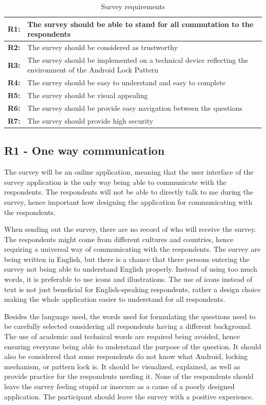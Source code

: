     \begin{table}[H]
      \centering
      \begin{tabular}{ p{1cm} | p{9cm} }
        \hline
        {\bf R1:} & The survey should be able to stand for all commutation to the respondents \\ \hline
        {\bf R2:} & The survey should be considered as trustworthy \\ \hline
        {\bf R3:} & The survey should be implemented on a technical device reflecting the environment of the Android Lock Pattern \\ \hline
        {\bf R4:} & The survey should be easy to understand and easy to complete \\ \hline
        {\bf R5:} & The survey should be visual appealing \\ \hline
        {\bf R6:} & The survey should be provide easy navigation between the questions \\ \hline
        {\bf R7:} & The survey should provide high security \\ \hline
      \end{tabular}
      \caption{Survey requirements}
      \label{tab:requirements}
    \end{table}

    \subsection*{R1 - One way communication}
    The survey will be an online application, meaning that the user interface of the survey application is the only way being able to communicate with the respondents. The respondents will not be able to directly talk to me during the survey, hence important how designing the application for communicating with the respondents.

    When sending out the survey, there are no record of who will receive the survey.  The respondents might come from different cultures and countries, hence requiring a universal way of communicating with the respondents. The survey are being written in English, but there is a chance that there persons entering the survey not being able to understand English properly. Instead of using too much words, it is preferable to use icons and illustrations. The use of icons instead of text is not just beneficial for English-speaking respondents, rather a design choice making the whole application easier to understand for all respondents.

    Besides the language used, the words used for formulating the questions need to be carefully selected considering all respondents having a different background. The use of academic and technical words are required being avoided, hence ensuring everyone being able to understand the purpose of the question. It should also be considered that some respondents do not know what Android, locking mechanism, or pattern lock is. It should be visualized, explained, as well as provide practice for the respondents needing it. None of the respondents should leave the survey feeling stupid or insecure as a cause of a poorly designed application. The participant should leave the survey with a positive experience. 

